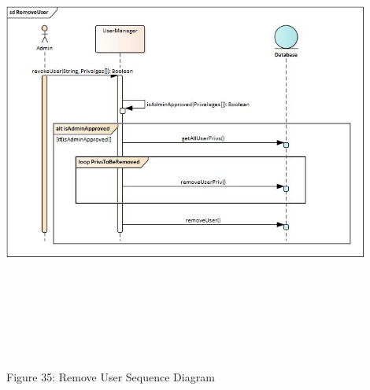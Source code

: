     \includegraphics[width=12cm,height=15cm,keepaspectratio]{admin_ui/images/sequence_diagrams/RemoveUser.jpg}
		\begin{center}
	    \small{Figure 35: Remove User Sequence Diagram}
    \end{center}




